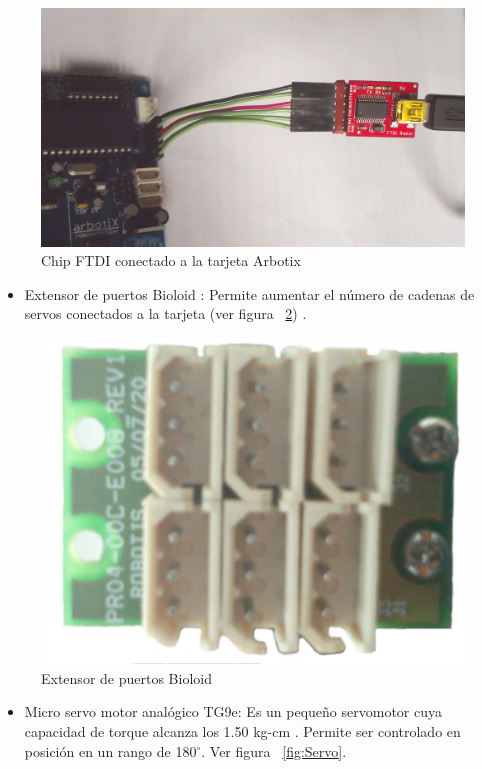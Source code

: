 \begin{figure}[hbtp]
\centering
\includegraphics[scale=0.06]{imagenes/DSCF1162.jpg}
\caption{Chip FTDI conectado a la tarjeta Arbotix}
\label{fig:ftdi}
\end{figure}

\begin{itemize}
\item Extensor de puertos Bioloid : Permite aumentar el número de cadenas de servos conectados a la tarjeta (ver figura ~\ref{fig:ext}) \cite{hub}.
\end{itemize}

\begin{figure}[hbtp]
\centering
\includegraphics[scale=0.08]{imagenes/extensor.jpg}
\caption{Extensor de puertos Bioloid}
\label{fig:ext}
\end{figure}

\begin{itemize}
\item Micro servo motor anal\'ogico TG9e: Es un pequeño servomotor cuya capacidad de torque alcanza los 1.50 kg-cm \cite{microservo}. Permite ser controlado en posición en un rango de 180$^{\circ}$. Ver figura ~\ref{fig:Servo}.  

\end{itemize}

